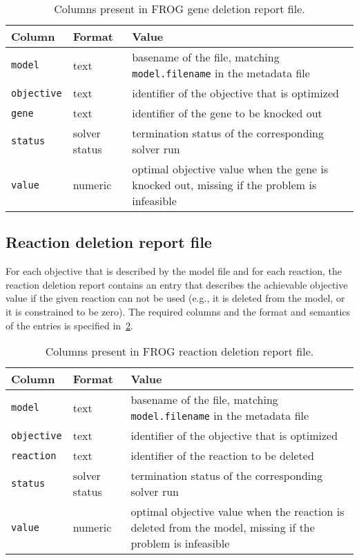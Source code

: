 \begin{table}[p]\tablefont
\begin{tabular}{llp{30em}}
\toprule
Column & Format & Value \\
\midrule
\verb|model|
 & text
 & basename of the file, matching \verb|model.filename| in the metadata file
 \\
\verb|objective|
 & text
 & identifier of the objective that is optimized
 \\
\verb|gene|
 & text
 & identifier of the gene to be knocked out
 \\
\verb|status|
 & solver status
 & termination status of the corresponding solver run
 \\
\verb|value|
 & numeric
 & optimal objective value when the gene is knocked out, missing if the problem is infeasible
 \\
\bottomrule
\end{tabular}
\caption{Columns present in FROG gene deletion report file.}
\label{tab:genefields}
\end{table}

\subsection{Reaction deletion report file}
\label{sec:rxns}

For each objective that is described by the model file and for each reaction, the reaction deletion report contains an entry that describes the achievable objective value if the given reaction can not be used (e.g., it is deleted from the model, or it is constrained to be zero). The required columns and the format and semantics of the entries is specified in~\cref{tab:rxnsfields}.

\begin{table}[p]\tablefont
\begin{tabular}{llp{30em}}
\toprule
Column & Format & Value \\
\midrule
\verb|model|
 & text
 & basename of the file, matching \verb|model.filename| in the metadata file
 \\
\verb|objective|
 & text
 & identifier of the objective that is optimized
 \\
\verb|reaction|
 & text
 & identifier of the reaction to be deleted
 \\
\verb|status|
 & solver status
 & termination status of the corresponding solver run
 \\
\verb|value|
 & numeric
 & optimal objective value when the reaction is deleted from the model, missing if the problem is infeasible
 \\
\bottomrule
\end{tabular}
\caption{Columns present in FROG reaction deletion report file.}
\label{tab:rxnsfields}
\end{table}
